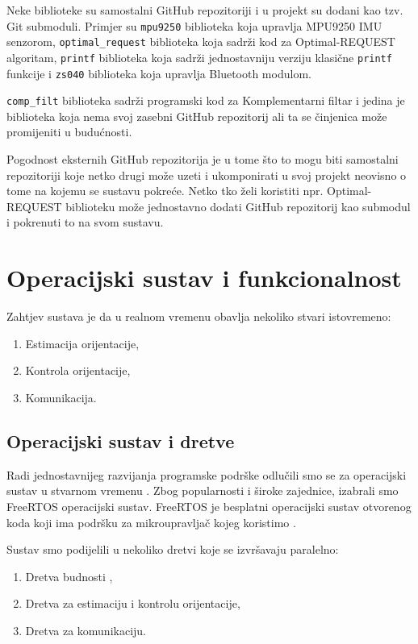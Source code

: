 \documentclass[times, utf8, diplomski, numeric]{templates/template}
\begin{document}
{{        Neke biblioteke su samostalni GitHub repozitoriji i u projekt su dodani kao tzv. Git submoduli. Primjer su \texttt{mpu9250} biblioteka koja upravlja MPU9250 IMU senzorom, \texttt{optimal\_request} biblioteka koja sadrži kod za Optimal-REQUEST algoritam, \texttt{printf} biblioteka koja sadrži jednostavniju verziju klasične \texttt{printf} funkcije i \texttt{zs040} biblioteka koja upravlja Bluetooth modulom.

        \texttt{comp\_filt} biblioteka sadrži programski kod za Komplementarni filtar i jedina je biblioteka koja nema svoj zasebni GitHub repozitorij ali ta se činjenica može promijeniti u budućnosti. 

        Pogodnost eksternih GitHub repozitorija je u tome što to mogu biti samostalni repozitoriji koje netko drugi može uzeti i ukomponirati u svoj projekt neovisno o tome na kojemu se sustavu pokreće. Netko tko želi koristiti npr. Optimal-REQUEST biblioteku može jednostavno dodati GitHub repozitorij kao submodul i pokrenuti to na svom sustavu. 
    }

    \section{Operacijski sustav i funkcionalnost}{
        Zahtjev sustava je da u realnom vremenu obavlja nekoliko stvari istovremeno:

        \begin{enumerate}
        \item Estimacija orijentacije,
        \item Kontrola orijentacije,
        \item Komunikacija.
        \end{enumerate}

        \subsection{Operacijski sustav i dretve}{
            Radi jednostavnijeg razvijanja programske podrške odlučili smo se za operacijski sustav u stvarnom vremenu . Zbog popularnosti i široke zajednice, izabrali smo FreeRTOS operacijski sustav. FreeRTOS je besplatni operacijski sustav otvorenog koda koji ima podršku za mikroupravljač kojeg koristimo \cite{freertos}. 
    
            Sustav smo podijelili u nekoliko dretvi koje se izvršavaju paralelno:
            \begin{enumerate}
            \item Dretva budnosti ,
            \item Dretva za estimaciju i kontrolu orijentacije,
            \item Dretva za komunikaciju.
            \end{enumerate}

}}}
\end{document}
